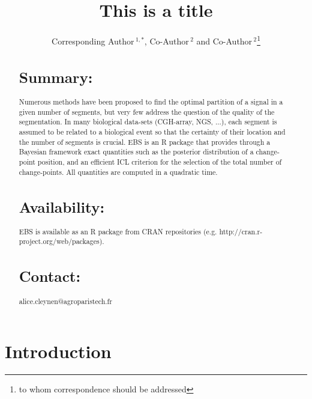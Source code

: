 \documentclass{bioinfo}
\begin{document}

\title[short Title]{This is a title}
\author[Sample \textit{et~al}]{Corresponding Author\,$^{1,*}$, Co-Author\,$^{2}$ and Co-Author\,$^2$\footnote{to whom correspondence should be addressed}}
\address{$^{1}$Department of XXXXXXX, Address XXXX etc.\\
$^{2}$Department of XXXXXXXX, Address XXXX etc.}



\maketitle


\begin{abstract}

\section{Summary:}
 Numerous methods have been proposed to find the optimal partition of a signal in a given number of segments, but very few address the question of the quality of the segmentation. In many biological data-sets (CGH-array, NGS, ...),  each segment is assumed to be related to a biological event so that the certainty of their location and the number of segments is crucial. EBS is an R package that provides through a Bayesian framework exact quantities such as the posterior distribution of a change-point position, and an efficient ICL criterion for the selection of the total number of change-points. All quantities are computed in a quadratic time.


\section{Availability:}
EBS is available as an R package from CRAN repositories (e.g. http://cran.r-project.org/web/packages).


\section{Contact:} alice.cleynen@agroparistech.fr
\end{abstract}

\section{Introduction}
\end{document}
